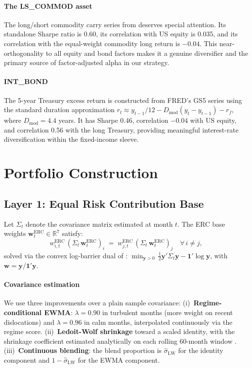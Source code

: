 \documentclass[11pt,letterpaper]{article}
\begin{document}
\paragraph{The LS\_COMMOD asset}
The long/short commodity carry series from \citet{Levine2018} deserves special
attention. Its standalone Sharpe ratio is 0.60, its correlation with US equity is
0.035, and its correlation with the equal-weight commodity long return is $-0.04$.
This near-orthogonality to all equity and bond factors makes it a genuine diversifier
and the primary source of factor-adjusted alpha in our strategy.

\paragraph{INT\_BOND}
The 5-year Treasury excess return is constructed from FRED's GS5 series using the
standard duration approximation $r_t \approx y_{t-1}/12 - D_{\text{mod}}(y_t - y_{t-1}) - r_f$,
where $D_{\text{mod}} = 4.4$ years. It has Sharpe 0.46, correlation $-0.04$ with
US equity, and correlation 0.56 with the long Treasury, providing meaningful
interest-rate diversification within the fixed-income sleeve.

\section{Portfolio Construction}

\subsection{Layer 1: Equal Risk Contribution Base}

Let $\Sigma_t$ denote the covariance matrix estimated at month $t$. The ERC base
weights $\mathbf{w}^{\text{ERC}}_t \in \mathbb{R}^7$ satisfy:
\begin{equation}
  w^{\text{ERC}}_{i,t}\,(\Sigma_t\,\mathbf{w}^{\text{ERC}}_t)_i
  \;=\;
  w^{\text{ERC}}_{j,t}\,(\Sigma_t\,\mathbf{w}^{\text{ERC}}_t)_j
  \quad \forall\, i \ne j,
  \label{eq:erc}
\end{equation}
solved via the convex log-barrier dual of \citet{Maillard2010}: $\min_{\mathbf{y}>0}\,
\frac{1}{2}\mathbf{y}'\Sigma_t\mathbf{y} - \mathbf{1}'\log\mathbf{y}$,
with $\mathbf{w} = \mathbf{y}/\mathbf{1}'\mathbf{y}$.

\paragraph{Covariance estimation}
We use three improvements over a plain sample covariance:
(i)~\textbf{Regime-conditional EWMA}: $\lambda = 0.90$ in turbulent months (more
weight on recent dislocations) and $\lambda = 0.96$ in calm months, interpolated
continuously via the regime score. (ii)~\textbf{Ledoit-Wolf shrinkage} toward a
scaled identity, with the shrinkage coefficient estimated analytically on each
rolling 60-month window \citep{LedoitWolf2004}. (iii)~\textbf{Continuous blending}:
the blend proportion is $\hat{\sigma}_{\text{LW}}$ for the identity component and
$1-\hat{\sigma}_{\text{LW}}$ for the EWMA component.
\end{document}
